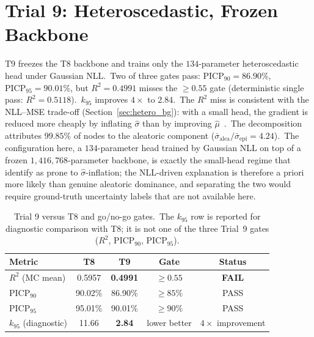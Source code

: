 \section{Trial 9: Heteroscedastic, Frozen Backbone}\label{sec:t9_results}

T9 freezes the T8 backbone and trains only the $134$-parameter heteroscedastic head under Gaussian NLL.\ Two of three gates pass: $\mathrm{PICP}_{90} = 86.90\%$, $\mathrm{PICP}_{95} = 90.01\%$, but $R^2 = 0.4991$ misses the $\geq 0.55$ gate (deterministic single pass: $R^2 = 0.5118$).\ $k_{95}$ improves $4\times$ to $2.84$.\ The $R^2$ miss is consistent with the NLL--MSE trade-off (Section~\ref{sec:hetero_bg}): with a small head, the gradient is reduced more cheaply by inflating $\hat\sigma$ than by improving $\hat\mu$~\cite{seitzer2022pitfalls}.\ The decomposition attributes $99.85\%$ of nodes to the aleatoric component ($\bar\sigma_\text{alea}/\bar\sigma_\text{epi} = 4.24$).\ The configuration here, a $134$-parameter head trained by Gaussian NLL on top of a frozen $1{,}416{,}768$-parameter backbone, is exactly the small-head regime that~\textcite{seitzer2022pitfalls} identify as prone to $\hat\sigma$-inflation; the NLL-driven explanation is therefore a priori more likely than genuine aleatoric dominance, and separating the two would require ground-truth uncertainty labels that are not available here.

\begin{table}[htbp]
\centering
\caption[Trial 9 gate check]{Trial 9 versus T8 and go/no-go gates.\ The $k_{95}$ row is reported for diagnostic comparison with T8; it is not one of the three Trial~9 gates ($R^2$, PICP$_{90}$, PICP$_{95}$).}
\label{tab:t9_gates}
\begin{tabular}{lcccc}
\toprule
Metric & T8 & T9 & Gate & Status \\
\midrule
$R^2$ (MC mean) & 0.5957 & \textbf{0.4991} & $\geq 0.55$ & \textbf{FAIL} \\
PICP$_{90}$ & 90.02\% & 86.90\% & $\geq 85\%$ & PASS \\
PICP$_{95}$ & 95.01\% & 90.01\% & $\geq 90\%$ & PASS \\
$k_{95}$ (diagnostic) & 11.66 & \textbf{2.84} & lower better & $4\times$ improvement \\
\bottomrule
\end{tabular}
\end{table}

